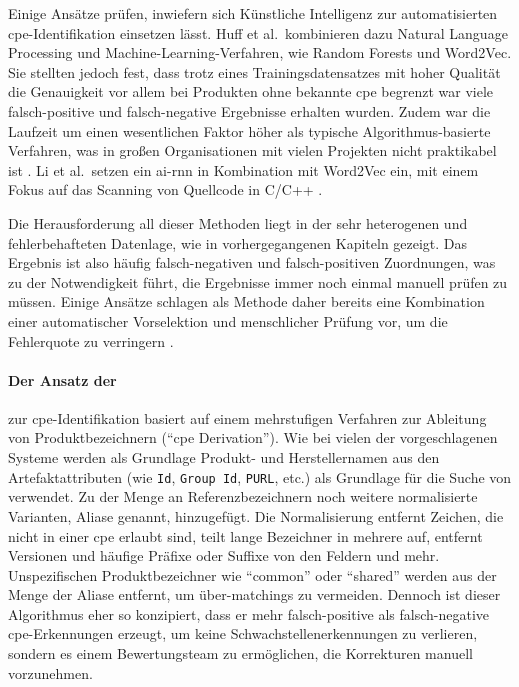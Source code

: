 Einige Ansätze prüfen, inwiefern sich Künstliche Intelligenz zur automatisierten \acrshort{cpe}-Identifikation einsetzen lässt.
Huff et al.\ kombinieren dazu Natural Language Processing und Machine-Learning-Verfahren, wie Random Forests und Word2Vec.
Sie stellten jedoch fest, dass trotz eines Trainingsdatensatzes mit hoher Qualität die Genauigkeit vor allem bei Produkten ohne bekannte \acrshort{cpe} begrenzt war viele falsch-positive und falsch-negative Ergebnisse erhalten wurden.
Zudem war die Laufzeit um einen wesentlichen Faktor höher als typische Algorithmus-basierte Verfahren, was in großen Organisationen mit vielen Projekten nicht praktikabel ist \autocite{Huff2021Recommender}.
Li et al.\ setzen ein \acrfull{ai-rnn} in Kombination mit Word2Vec ein, mit einem Fokus auf das Scanning von Quellcode in C/C++ \autocite{8846081}.

\medskip

Die Herausforderung all dieser Methoden liegt in der sehr heterogenen und fehlerbehafteten Datenlage, wie in vorhergegangenen Kapiteln gezeigt.
Das Ergebnis ist also häufig falsch-negativen und falsch-positiven Zuordnungen, was zu der Notwendigkeit führt, die Ergebnisse immer noch einmal manuell prüfen zu müssen.
Einige Ansätze schlagen als Methode daher bereits eine Kombination einer automatischer Vorselektion und menschlicher Prüfung vor, um die Fehlerquote zu verringern \autocite{Takahashi_Miyamoto_Nakao_2016, Sanguino_Uetz_2017}.

\paragraph{Der Ansatz der \metaeffekt}
zur \acrshort{cpe}-Identifikation basiert auf einem mehrstufigen Verfahren zur Ableitung von Produktbezeichnern (\enquote{\acrshort{cpe} Derivation}).
Wie bei vielen der vorgeschlagenen Systeme werden als Grundlage Produkt- und Herstellernamen aus den Artefaktattributen (wie \texttt{Id}, \texttt{Group Id}, \texttt{PURL}, etc.) als Grundlage für die Suche von  verwendet.
Zu der Menge an Referenzbezeichnern noch weitere normalisierte Varianten, Aliase genannt, hinzugefügt.
Die Normalisierung entfernt Zeichen, die nicht in einer \acrshort{cpe} erlaubt sind, teilt lange Bezeichner in mehrere auf, entfernt Versionen und häufige Präfixe oder Suffixe von den Feldern und mehr.
Unspezifischen Produktbezeichner wie \enquote{common} oder \enquote{shared} werden aus der Menge der Aliase entfernt, um über-matchings zu vermeiden.
Dennoch ist dieser Algorithmus eher so konzipiert, dass er mehr falsch-positive als falsch-negative \acrshort{cpe}-Erkennungen erzeugt, um keine Schwachstellenerkennungen zu verlieren, sondern es einem Bewertungsteam zu ermöglichen, die Korrekturen manuell vorzunehmen.

